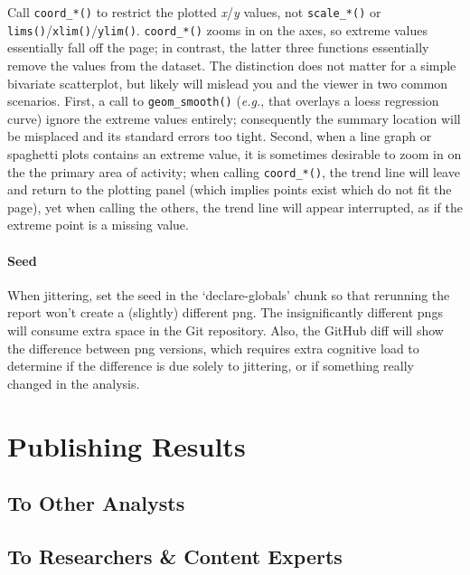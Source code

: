 \documentclass[
]{book}
\begin{document}
Call \texttt{coord\_*()} to restrict the plotted \emph{x}/\emph{y} values, not \texttt{scale\_*()} or \texttt{lims()}/\texttt{xlim()}/\texttt{ylim()}. \texttt{coord\_*()} zooms in on the axes, so extreme values essentially fall off the page; in contrast, the latter three functions essentially remove the values from the dataset. The distinction does not matter for a simple bivariate scatterplot, but likely will mislead you and the viewer in two common scenarios. First, a call to \texttt{geom\_smooth()} (\emph{e.g.}, that overlays a loess regression curve) ignore the extreme values entirely; consequently the summary location will be misplaced and its standard errors too tight. Second, when a line graph or spaghetti plots contains an extreme value, it is sometimes desirable to zoom in on the the primary area of activity; when calling \texttt{coord\_*()}, the trend line will leave and return to the plotting panel (which implies points exist which do not fit the page), yet when calling the others, the trend line will appear interrupted, as if the extreme point is a missing value.

\hypertarget{style-ggplot-seed}{%
\subsubsection{Seed}\label{style-ggplot-seed}}

When jittering, set the seed in the `declare-globals' chunk so that rerunning the report won't create a (slightly) different png. The insignificantly different pngs will consume extra space in the Git repository. Also, the GitHub diff will show the difference between png versions, which requires extra cognitive load to determine if the difference is due solely to jittering, or if something really changed in the analysis.

\hypertarget{publication}{%
\chapter{Publishing Results}\label{publication}}

\hypertarget{to-other-analysts}{%
\section{To Other Analysts}\label{to-other-analysts}}

\hypertarget{to-researchers-content-experts}{%
\section{To Researchers \& Content Experts}\label{to-researchers-content-experts}}
\end{document}
